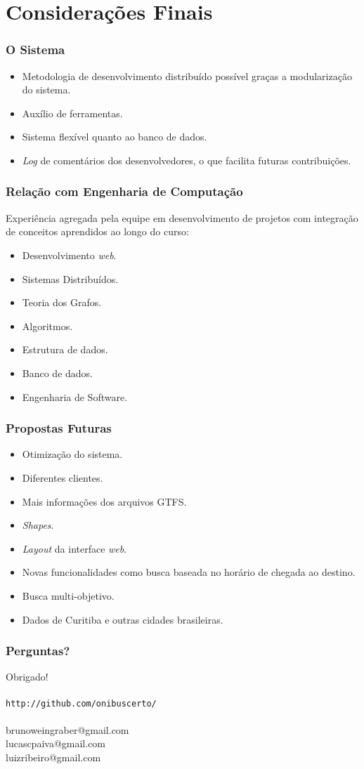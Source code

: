 \section{Considerações Finais}

\frame
{
\frametitle{O Sistema}
\begin{itemize}
	\item Metodologia de desenvolvimento distribuído possível graças a modularização do sistema.
	\item Auxílio de ferramentas.
	\item Sistema flexível quanto ao banco de dados.
	\item \emph{Log} de comentários dos desenvolvedores, o que facilita futuras contribuições.
\end{itemize}
}

\frame
{
\frametitle{Relação com Engenharia de Computação}
Experiência agregada pela equipe em desenvolvimento de projetos com integração de conceitos aprendidos ao longo do curso:
\begin{itemize}
\item Desenvolvimento \emph{web}.
\item Sistemas Distribuídos.
\item Teoria dos Grafos.
\item Algoritmos.
\item Estrutura de dados.
\item Banco de dados.
\item Engenharia de Software.
\end{itemize}
}

\frame
{
\frametitle{Propostas Futuras}
\begin{itemize}
\item Otimização do sistema.
\item Diferentes clientes.
\item Mais informações dos arquivos GTFS.
\item \emph{Shapes}.
\item \emph{Layout} da interface \emph{web}.
\item Novas funcionalidades como busca baseada no horário de chegada ao destino.
\item Busca multi-objetivo.
\item Dados de Curitiba e outras cidades brasileiras.
\end{itemize}
}

\frame
{
\frametitle{Perguntas?}
\begin{center}
\vskip15pt \Huge Obrigado! \\
~ \\
\normalsize \texttt{http://github.com/onibuscerto/} \\
~ \\
brunoweingraber@gmail.com \\
lucascpaiva@gmail.com \\
luizribeiro@gmail.com \\
\end{center}
}
